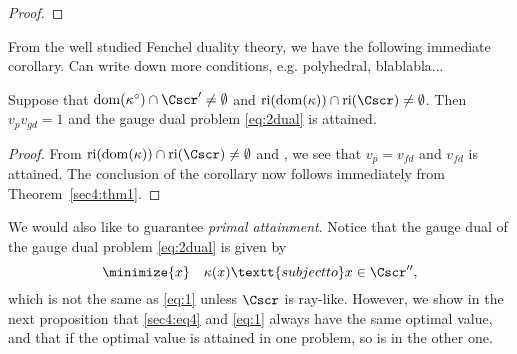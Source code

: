 \documentclass{siamltex}   %
\begin{document}
\begin{proof}
  \end{proof}

  From the well studied Fenchel duality theory, we have the following immediate corollary. {\color{red} Can write down more conditions, e.g. polyhedral, blablabla...}
  \begin{corollary}
    Suppose that ${\rm dom}(\kappa^\circ)\cap \Cscr'\neq \emptyset$ and ${\rm ri}({\rm dom}(\kappa))\cap {\rm ri}(\Cscr)\neq \emptyset$.
    Then $v_pv_{gd}=1$ and the gauge dual problem \eqref{eq:2dual} is attained.
  \end{corollary}
  \begin{proof}
    From ${\rm ri}({\rm dom}(\kappa))\cap {\rm ri}(\Cscr)\neq \emptyset$ and \cite[Theorem~31.1]{Roc70}, we see that $v_p = v_{fd}$ and $v_{fd}$
    is attained. The conclusion of the corollary now follows immediately from Theorem~\ref{sec4:thm1}.
  \end{proof}

  We would also like to guarantee {\em primal attainment}. Notice that the gauge dual of the gauge dual problem \eqref{eq:2dual} is given by
  \begin{equation}
    \label{sec4:eq4}
    \minimize{x} \quad \kappa(x) \textt{subject to} x\in\Cscr'',
  \end{equation}
  which is not the same as \eqref{eq:1} unless $\Cscr$ is ray-like.
  However, we show in the next proposition that \eqref{sec4:eq4} and \eqref{eq:1} always have
  the same optimal value, and that if the optimal value is attained in one problem, so is in the other one.
\end{document}
